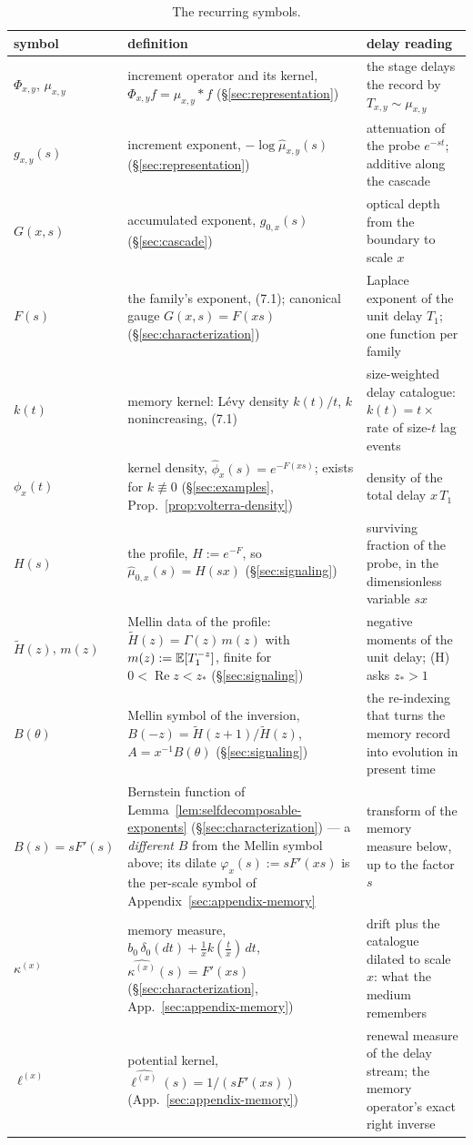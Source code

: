 \begin{table}[!tp]
\centering
\caption{The recurring symbols.}
\label{tab:notation}
\footnotesize
\setlength{\tabcolsep}{4pt}
\begin{tabular}{@{}lp{6.4cm}p{5.2cm}@{}}
\toprule
symbol & definition & delay reading \\
\midrule
$\Phi_{x,y}$, $\mu_{x,y}$ & increment operator and its kernel, $\Phi_{x,y}f = \mu_{x,y}*f$ (\S\ref{sec:representation}) & the stage delays the record by $T_{x,y} \sim \mu_{x,y}$ \\
$g_{x,y}(s)$ & increment exponent, $-\log\hat\mu_{x,y}(s)$ (\S\ref{sec:representation}) & attenuation of the probe $e^{-st}$; additive along the cascade \\
$G(x,s)$ & accumulated exponent, $g_{0,x}(s)$ (\S\ref{sec:cascade}) & optical depth from the boundary to scale $x$ \\
$F(s)$ & the family's exponent, (7.1); canonical gauge $G(x,s) = F(xs)$ (\S\ref{sec:characterization}) & Laplace exponent of the unit delay $T_1$; one function per family \\
$k(t)$ & memory kernel: L\'evy density $k(t)/t$, $k$ nonincreasing, (7.1) & size-weighted delay catalogue: $k(t) = t \times$ rate of size-$t$ lag events \\
$\phi_x(t)$ & kernel density, $\hat\phi_x(s) = e^{-F(xs)}$; exists for $k \not\equiv 0$ (\S\ref{sec:examples}, Prop.~\ref{prop:volterra-density}) & density of the total delay $x\,T_1$ \\
$H(s)$ & the profile, $H := e^{-F}$, so $\hat\mu_{0,x}(s) = H(sx)$ (\S\ref{sec:signaling}) & surviving fraction of the probe, in the dimensionless variable $sx$ \\
$\tilde H(z)$, $m(z)$ & Mellin data of the profile: $\tilde H(z) = \Gamma(z)\,m(z)$ with $m(z) := \mathbb{E}[T_1^{-z}]$, finite for $0 < \operatorname{Re} z < z_*$ (\S\ref{sec:signaling}) & negative moments of the unit delay; (H) asks $z_* > 1$ \\
$B(\theta)$ & Mellin symbol of the inversion, $B(-z) = \tilde H(z{+}1)/\tilde H(z)$, $A = x^{-1}B(\theta)$ (\S\ref{sec:signaling}) & the re-indexing that turns the memory record into evolution in present time \\
$B(s) = sF'(s)$ & Bernstein function of Lemma~\ref{lem:selfdecomposable-exponents} (\S\ref{sec:characterization}) --- a \emph{different} $B$ from the Mellin symbol above; its dilate $\varphi_x(s) := sF'(xs)$ is the per-scale symbol of Appendix~\ref{sec:appendix-memory} & transform of the memory measure below, up to the factor $s$ \\
$\kappa^{(x)}$ & memory measure, $b_0\,\delta_0(dt) + \tfrac1x k(\tfrac tx)\,dt$, $\widehat{\kappa^{(x)}}(s) = F'(xs)$ (\S\ref{sec:characterization}, App.~\ref{sec:appendix-memory}) & drift plus the catalogue dilated to scale $x$: what the medium remembers \\
$\ell^{(x)}$ & potential kernel, $\widehat{\ell^{(x)}}(s) = 1/(sF'(xs))$ (App.~\ref{sec:appendix-memory}) & renewal measure of the delay stream; the memory operator's exact right inverse \\
\bottomrule
\end{tabular}
\end{table}

